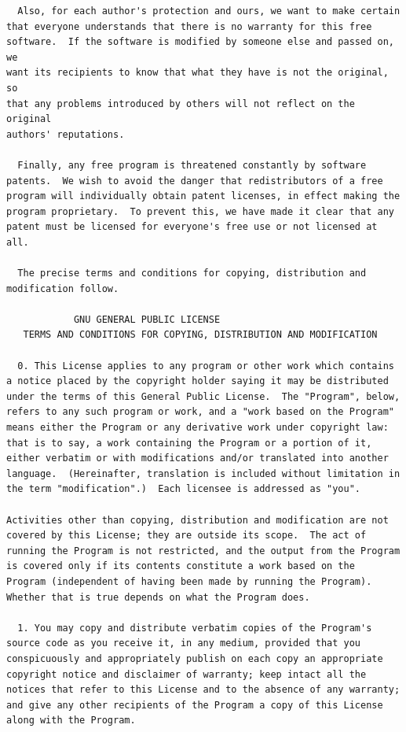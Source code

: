 \documentclass[a4paper,BCOR30mm,DIV14,pdftex,liststotoc,footsepline,openany]{scrbook}
\begin{document}
\begin{verbatim}
  Also, for each author's protection and ours, we want to make certain
that everyone understands that there is no warranty for this free
software.  If the software is modified by someone else and passed on, we
want its recipients to know that what they have is not the original, so
that any problems introduced by others will not reflect on the original
authors' reputations.

  Finally, any free program is threatened constantly by software
patents.  We wish to avoid the danger that redistributors of a free
program will individually obtain patent licenses, in effect making the
program proprietary.  To prevent this, we have made it clear that any
patent must be licensed for everyone's free use or not licensed at all.

  The precise terms and conditions for copying, distribution and
modification follow.

		    GNU GENERAL PUBLIC LICENSE
   TERMS AND CONDITIONS FOR COPYING, DISTRIBUTION AND MODIFICATION

  0. This License applies to any program or other work which contains
a notice placed by the copyright holder saying it may be distributed
under the terms of this General Public License.  The "Program", below,
refers to any such program or work, and a "work based on the Program"
means either the Program or any derivative work under copyright law:
that is to say, a work containing the Program or a portion of it,
either verbatim or with modifications and/or translated into another
language.  (Hereinafter, translation is included without limitation in
the term "modification".)  Each licensee is addressed as "you".

Activities other than copying, distribution and modification are not
covered by this License; they are outside its scope.  The act of
running the Program is not restricted, and the output from the Program
is covered only if its contents constitute a work based on the
Program (independent of having been made by running the Program).
Whether that is true depends on what the Program does.

  1. You may copy and distribute verbatim copies of the Program's
source code as you receive it, in any medium, provided that you
conspicuously and appropriately publish on each copy an appropriate
copyright notice and disclaimer of warranty; keep intact all the
notices that refer to this License and to the absence of any warranty;
and give any other recipients of the Program a copy of this License
along with the Program.


\end{verbatim}
\end{document}
